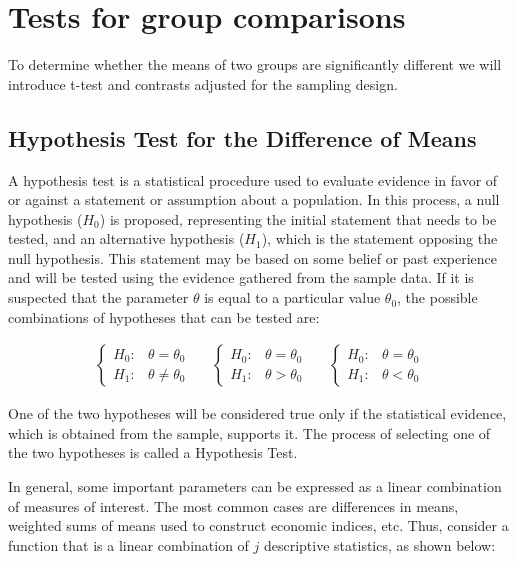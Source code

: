 \documentclass[
  12pt,
]{book}
\begin{document}
\section{Tests for group comparisons}\label{tests-for-group-comparisons}

To determine whether the means of two groups are significantly different we will introduce t-test and contrasts adjusted for the sampling design.

\subsection{Hypothesis Test for the Difference of Means}\label{hypothesis-test-for-the-difference-of-means}

A hypothesis test is a statistical procedure used to evaluate evidence in favor of or against a statement or assumption about a population. In this process, a null hypothesis (\(H_0\)) is proposed, representing the initial statement that needs to be tested, and an alternative hypothesis (\(H_1\)), which is the statement opposing the null hypothesis. This statement may be based on some belief or past experience and will be tested using the evidence gathered from the sample data. If it is suspected that the parameter \(\theta\) is equal to a particular value \(\theta_{0}\), the possible combinations of hypotheses that can be tested are:

\begin{eqnarray*}
\begin{cases}
H_{0}: & \theta=\theta_{0}\\
H_{1}: & \theta\neq\theta_{0}
\end{cases}\,\,\,\,\,\,\,\,\,   
\begin{cases}
H_{0}: & \theta=\theta_{0}\\
H_{1}: & \theta>\theta_{0}
\end{cases}\,\,\,\,\,\,\,\,\,   
\begin{cases}
H_{0}: & \theta=\theta_{0}\\
H_{1}: & \theta<\theta_{0}
\end{cases}
\end{eqnarray*}

One of the two hypotheses will be considered true only if the statistical evidence, which is obtained from the sample, supports it. The process of selecting one of the two hypotheses is called a Hypothesis Test.

In general, some important parameters can be expressed as a linear combination of measures of interest. The most common cases are differences in means, weighted sums of means used to construct economic indices, etc. Thus, consider a function that is a linear combination of \(j\) descriptive statistics, as shown below:
\end{document}
